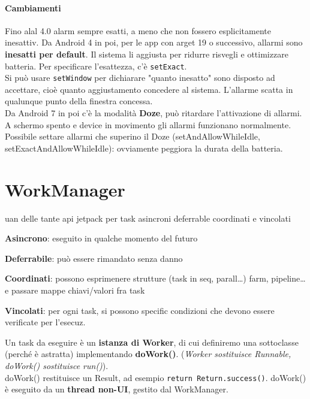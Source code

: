 \documentclass[10pt]{book}
\begin{document}
\paragraph{Cambiamenti} Fino alal 4.0 alarm sempre esatti, a meno che non fossero esplicitamente inesattiv. Da Android 4 in poi, per le app con arget 19 o successivo, allarmi sono \textbf{inesatti per default}. Il sistema li aggiusta per ridurre risvegli e ottimizzare batteria. Per specificare l'esattezza, c'è \texttt{setExact}.\\
Si può usare \texttt{setWindow} per dichiarare "quanto inesatto" sono disposto ad accettare, cioè quanto aggiustamento concedere al sistema. L'allarme scatta in qualunque punto della finestra concessa.\\
Da Android 7 in poi c'è la modalità \textbf{Doze}, può ritardare l'attivazione di allarmi. A schermo spento e device in movimento gli allarmi funzionano normalmente.\\Possibile settare allarmi che superino il Doze (setAndAllowWhileIdle, setExactAndAllowWhileIdle): ovviamente peggiora la durata della batteria.
\section{WorkManager}
uan delle tante api jetpack per task asincroni deferrable coordinati e vincolati
\begin{list}{}{}
	\item \textbf{Asincrono}: eseguito in qualche momento del futuro
	\item \textbf{Deferrabile}: può essere rimandato senza danno
	\item \textbf{Coordinati}: possono esprimenere strutture (task in seq, parall\ldots) farm, pipeline\ldots e passare mappe chiavi/valori fra task
	\item \textbf{Vincolati}: per ogni task, si possono specific condizioni che devono essere verificate per l'esecuz.
\end{list}
Un task da eseguire è un \textbf{istanza di Worker}, di cui definiremo una sottoclasse (perché è astratta) implementando \textbf{doWork()}. (\textit{Worker sostituisce Runnable, doWork() sostituisce run()}).\\
doWork() restituisce un Result, ad esempio \texttt{return Return.success()}. doWork() è eseguito da un \textbf{thread non-UI}, gestito dal WorkManager.
\end{document}
